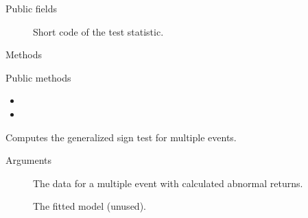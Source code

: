 \documentclass[a4paper]{book}
\begin{document}
%
\begin{Section}{Public fields}

\begin{description}

\item[] Short code of the test statistic.

\end{description}


\end{Section}
%
\begin{Section}{Methods}
%
\begin{SubSection}{Public methods}
\begin{itemize}

\item{} 
\item{} 

\end{itemize}

\end{SubSection}




\hypertarget{method-GeneralizedSignTest-compute}{}
%
\begin{SubSection}{}
Computes the generalized sign test for multiple events.
%

%
\begin{SubSubSection}{Arguments}

\begin{description}

\item[] The data for a multiple event with
calculated abnormal returns.
\item[] The fitted model (unused).

\end{description}



\end{SubSubSection}


\end{SubSection}
\end{Section}
\end{document}
